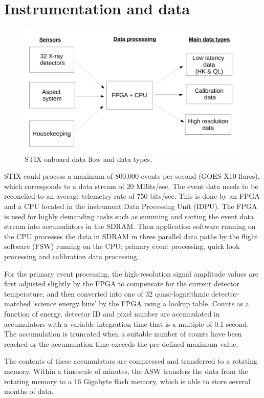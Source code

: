 \documentclass{aa}
\begin{document}
\section{Instrumentation and data}

\begin{figure}
    \centering
    \includegraphics[width=0.8\linewidth]{figures/onboardDataFlow.pdf}
    \caption{STIX onboard data flow and data types.}
    \label{fig:stix_onbard_data_flow}
\end{figure}

STIX could process a maximum of 800,000 events per second (GOES X10 flares), which corresponds to  a data stream  of 20 MBits/sec. The event data needs to be reconciled to an average telemetry rate of 750 bits/sec.  This is done by an FPGA and a CPU located in the instrument Data Processing Unit (IDPU).  The FPGA is used for highly demanding tasks such as summing and sorting the event data stream into accumulators in the SDRAM.  Then application software running on the CPU processes the data in SDRAM 
in three parallel data paths by the flight software (FSW) running on the CPU: primary event processing, quick look processing and calibration data processing. 

For the primary event processing, the high-resolution signal amplitude values are first adjusted slightly by the FPGA to compensate for the current detector temperature, and then converted 
into one of 32 quasi-logarithmic detector-matched ‘science energy bins’ by the FPGA using a lookup table. Counts as a function of energy, detector ID and pixel number are accumulated in accumulators with a variable integration time that is a multiple of 0.1 second.  
The accumulation is truncated when a suitable number of counts have been reached or the accumulation time exceeds the pre-defined maximum value.

The contents of these accumulators are compressed and transferred to a rotating memory. 
Within a timescale of minutes, the ASW transfers the data from the rotating memory to a 16 Gigabyte flash memory, which is able to store several months of data.
\end{document}
